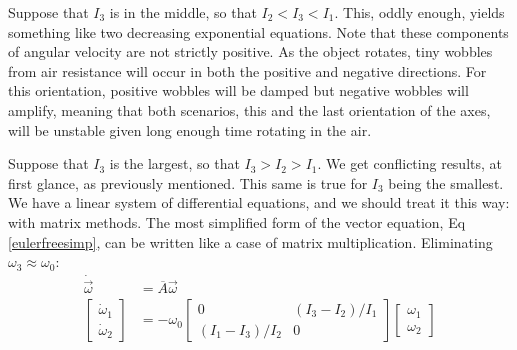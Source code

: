 \documentclass[10pt]{article}
\begin{document}
Suppose that $I_3$ is in the middle, so that $I_2<I_3<I_1$. This, oddly enough,
yields something like two decreasing exponential equations. Note that these 
components of angular velocity are not strictly positive. As the 
object rotates, tiny wobbles from air resistance 
will occur in both the positive and negative directions. For this orientation,
positive wobbles will be damped but negative wobbles will amplify, meaning 
that both scenarios, this and the last orientation of the axes, will 
be unstable given long enough time rotating in the air.

Suppose that $I_3$ is the largest, so that $I_3>I_2>I_1$. We get 
conflicting results, at first glance, as previously mentioned. This same is 
true for $I_3$ being the smallest. We have a linear system of 
differential equations, and we should treat it this way: with matrix methods.
The most simplified form of the vector equation, Eq \ref{eulerfreesimp},
can be written like a case of matrix multiplication. 
Eliminating $\omega_3\approx\omega_0$:
\begin{align}
    \dot{\vec{\omega}} &= \overline{A}\vec{\omega} \\
    \begin{bmatrix}
        \dot{\omega}_1 \\
        \dot{\omega}_2
    \end{bmatrix}
    &=-\omega_0
    \begin{bmatrix}
    0 & (I_3 - I_2)/I_1 \\
    (I_1 - I_3)/I_2 & 0
    \end{bmatrix}
    \begin{bmatrix}
        \omega_1 \\
        \omega_2
    \end{bmatrix}
\end{align}
\end{document}
